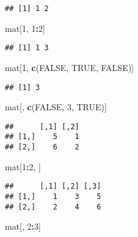 \documentclass[]{article}
\newenvironment{Shaded}{\begin{snugshade}}{\end{snugshade}}
\newcommand{\DecValTok}[1]{\textcolor[rgb]{0.00,0.00,0.81}{#1}}
\newcommand{\KeywordTok}[1]{\textcolor[rgb]{0.13,0.29,0.53}{\textbf{#1}}}
\newcommand{\NormalTok}[1]{#1}
\newcommand{\OperatorTok}[1]{\textcolor[rgb]{0.81,0.36,0.00}{\textbf{#1}}}
\newcommand{\OtherTok}[1]{\textcolor[rgb]{0.56,0.35,0.01}{#1}}
\begin{document}
\begin{verbatim}
## [1] 1 2
\end{verbatim}

\begin{Shaded}
\begin{Highlighting}[]
\NormalTok{mat[}\DecValTok{1}\NormalTok{, }\DecValTok{1}\OperatorTok{:}\DecValTok{2}\NormalTok{]}
\end{Highlighting}
\end{Shaded}

\begin{verbatim}
## [1] 1 3
\end{verbatim}

\begin{Shaded}
\begin{Highlighting}[]
\NormalTok{mat[}\DecValTok{1}\NormalTok{, }\KeywordTok{c}\NormalTok{(}\OtherTok{FALSE}\NormalTok{, }\OtherTok{TRUE}\NormalTok{, }\OtherTok{FALSE}\NormalTok{)]}
\end{Highlighting}
\end{Shaded}

\begin{verbatim}
## [1] 3
\end{verbatim}

\begin{Shaded}
\begin{Highlighting}[]
\NormalTok{mat[, }\KeywordTok{c}\NormalTok{(}\OtherTok{FALSE}\NormalTok{, }\DecValTok{3}\NormalTok{, }\OtherTok{TRUE}\NormalTok{)]}
\end{Highlighting}
\end{Shaded}

\begin{verbatim}
##      [,1] [,2]
## [1,]    5    1
## [2,]    6    2
\end{verbatim}

\begin{Shaded}
\begin{Highlighting}[]
\NormalTok{mat[}\DecValTok{1}\OperatorTok{:}\DecValTok{2}\NormalTok{, ]}
\end{Highlighting}
\end{Shaded}

\begin{verbatim}
##      [,1] [,2] [,3]
## [1,]    1    3    5
## [2,]    2    4    6
\end{verbatim}

\begin{Shaded}
\begin{Highlighting}[]
\NormalTok{mat[, }\DecValTok{2}\OperatorTok{:}\DecValTok{3}\NormalTok{]}
\end{Highlighting}
\end{Shaded}
\end{document}
